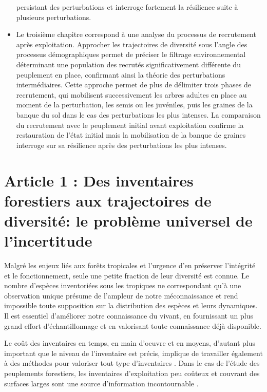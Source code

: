 \documentclass[
  11pt,
  french,
  A4paper,
  extrafontsizes,onecolumn,openright
  ]{memoir}
\begin{document}
\begin{itemize}
  persistant des perturbations et interroge fortement la résilience
  suite à plusieurs perturbations.
\item
  Le troisième chapitre correspond à une analyse du processus de
  recrutement après exploitation. Approcher les trajectoires de
  diversité sous l'angle des processus démographiques permet de préciser
  le filtrage environnemental déterminant une population des recrutés
  significativement différente du peuplement en place, confirmant ainsi
  la théorie des perturbations intermédiaires. Cette approche permet de
  plus de délimiter trois phases de recrutement, qui mobilisent
  successivement les arbres adultes en place au moment de la
  perturbation, les semis ou les juvéniles, puis les graines de la
  banque du sol dans le cas des perturbations les plus intenses. La
  comparaison du recrutement avec le peuplement initial avant
  exploitation confirme la restauration de l'état initial mais la
  mobilisation de la banque de graines interroge sur sa résilience après
  des perturbations les plus intenses.
\end{itemize}

\chapter{Article 1 : Des inventaires forestiers aux trajectoires de
diversité: le problème universel de
l'incertitude}\label{article-1-des-inventaires-forestiers-aux-trajectoires-de-diversite-le-probleme-universel-de-lincertitude}

Malgré les enjeux liés aux forêts tropicales et l'urgence d'en préserver
l'intégrité et le fonctionnement, seule une petite fraction de leur
diversité est connue. Le nombre d'espèces inventoriées sous les
tropiques ne correspondant qu'à une observation unique
\autocite{Feeley2011} présume de l'ampleur de notre méconnaissance et
rend impossible toute supposition sur la distribution des espèces et
leurs dynamiques. Il est essentiel d'améliorer notre connaissance du
vivant, en fournissant un plus grand effort d'échantillonnage et en
valorisant toute connaissance déjà disponible.

Le coût des inventaires en temps, en main d'oeuvre et en moyens,
d'autant plus important que le niveau de l'inventaire est précis,
implique de travailler également à des méthodes pour valoriser tout type
d'inventaires \autocite{Baraloto2012}. Dans le cas de l'étude des
peuplements forestiers, les inventaires d'exploitation peu coûteux et
couvrant des surfaces larges sont une source d'information
incontournable \autocites{terSteege2000}{Guitet2014}.
\end{document}
